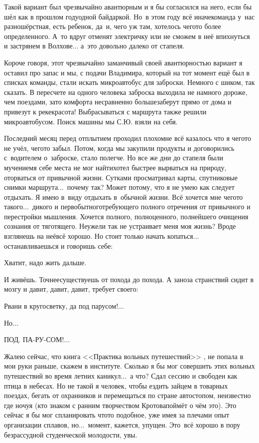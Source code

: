 Такой вариант был чрезвычайно авантюрным и я бы согласился на него, если бы шёл как в прошлом году\mdash одной байдаркой. Но~в этом году всё иначе\mdash команда у~нас разношёрстная, есть ребенок, да~и, чего уж там, хотелось чего\sdash то более определенного. А~то вдруг отменят электричку или не сможем в неё впихнуться и застрянем в Волхове$\ldots$ а~это довольно далеко от стапеля.
 
Короче говоря, этот чрезвычайно заманчивый своей авантюрностью вариант я оставил про запас и мы, с подачи Владимира, который на тот момент ещё был в списках команды, стали искать микроавтобус для заброски. Немного с шиком, так сказать. В пересчете на одного человека заброска выходила не намного дороже, чем поездами, зато комфорта несравненно больше\mdash заберут прямо от дома и привезут к реке\mdash  красота! Выбрасываться с маршрута также решили микроавтобусом. Поиск машины мы С.Ю. взяли на себя.

Последний месяц перед отплытием проходил плохо\mdash мне всё казалось что я чего\sdash то не учёл, чего\sdash то забыл. Потом, когда мы закупили продукты и договорились с~водителем о~заброске, стало полегче. Но все же дни до стапеля были мучением\mdash я себе места не мог найти\mdash хотел быстрее вырваться на природу, оторваться от привычной жизни. Сутками просматривал карты, спутниковые снимки маршрута$\ldots$~почему так? Может потому, что я не умею как следует отдыхать. Я имею в~виду отдыхать в~обычной жизни. Всё хочется мне чего\sdash то такого$\ldots$~дикого и первобытного\mdash  требующего полного отречения от привычного и перестройки мышления. Хочется полного, полноценного, полнейшего очищения сознания от тяготящего.  Неужели так не устраивает меня моя жизнь? Вроде взглянешь на неё\mdash всё хорошо. Но стоит только начать копаться$\ldots$~ останавливаешься и говоришь себе: 

\diagdash Хватит, надо жить дальше. 

И живёшь. Точнее\mdash существуешь от похода до похода. А заноза странствий сидит в мозгу и давит, давит, давит, требует своего:

\diagdash Рвани в кругосветку, да под парусом!$\ldots$

\diagdash Но$\ldots$

\diagdash ПОД. ПА-РУ-СОМ!$\ldots$

Жалею сейчас, что книга <<Практика вольных путешествий>> \cite{Кротов}, не попала в мои руки раньше, скажем в институте. Сколько я бы мог совершить этих вольных путешествий во время летних каникул$\ldots$~а что? Сдал сессию и свободен как птица в небесах. Но не такой я человек, чтобы ездить зайцем в товарных поездах, бегать от охранников и перемещаться по стране автостопом, неизвестно где ночуя (кто знаком с ранним творчеством Кротова\mdash поймёт о чём это). Это сейчас я бы мог спланировать что\sdash то подобное, уже имея за плечами опыт организации сплавов, но$\ldots$~момент, кажется, упущен. Это~всё хорошо в пору безрассудной студенческой молодости, увы.

